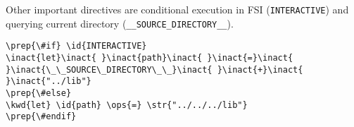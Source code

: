 \documentclass[10pt,landscape]{article}
\newcommand{\id}[1]{\textcolor[HTML]{000000}{#1}}
\newcommand{\str}[1]{\textcolor[HTML]{A31515}{#1}}
\newcommand{\kwd}[1]{\textcolor[HTML]{0000FF}{#1}}
\newcommand{\ops}[1]{\textcolor[HTML]{000000}{#1}}
\newcommand{\inact}[1]{\textcolor[HTML]{808080}{#1}}
\newcommand{\prep}[1]{\textcolor[HTML]{0000FF}{#1}}
\begin{document}
\begin{multicols}{3}
Other important directives are conditional execution in FSI (\texttt{INTERACTIVE}) and querying current directory (\texttt{\_\_SOURCE\_DIRECTORY\_\_}).
\begin{Verbatim}[commandchars=\\\{\}]
\prep{\#if} \id{INTERACTIVE}
\inact{let}\inact{ }\inact{path}\inact{ }\inact{=}\inact{ }\inact{\_\_SOURCE\_DIRECTORY\_\_}\inact{ }\inact{+}\inact{ }\inact{"../lib"}
\prep{\#else}
\kwd{let} \id{path} \ops{=} \str{"../../../lib"}
\prep{\#endif}
\end{Verbatim}





\end{multicols}
\end{document}
